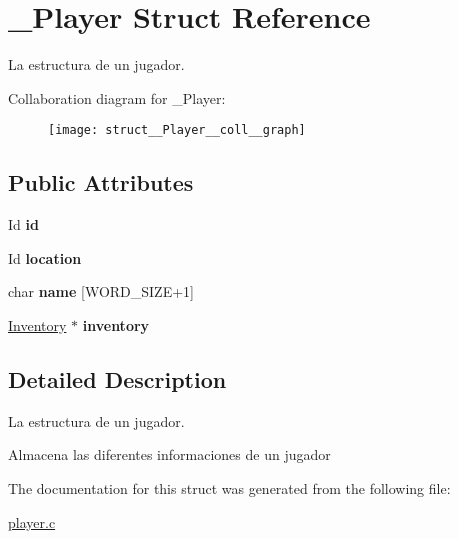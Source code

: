 \hypertarget{struct__Player}{}\section{\+\_\+\+Player Struct Reference}
\label{struct__Player}


La estructura de un jugador.  




Collaboration diagram for \+\_\+\+Player\+:\nopagebreak
\begin{figure}[H]
\begin{center}
\leavevmode
\texttt{[image: struct\_\_Player\_\_coll\_\_graph]}
\end{center}
\end{figure}
\subsection*{Public Attributes}
\begin{DoxyCompactItemize}
\item 
\mbox{\label{struct__Player_a60d635cd063816a9c1bd873f4868bb90}} 
Id {\bfseries id}
\item 
\mbox{\label{struct__Player_adbb6195d15b88f3f658e74274eff52d8}} 
Id {\bfseries location}
\item 
\mbox{\label{struct__Player_ac89715f913cc607b75eb7236765c41f5}} 
char {\bfseries name} \mbox{[}W\+O\+R\+D\+\_\+\+S\+I\+ZE+1\mbox{]}
\item 
\mbox{\label{struct__Player_a5e02924cb82ca61f74ba414d190aa29b}} 
\hyperlink{struct__Inventory}{Inventory} $\ast$ {\bfseries inventory}
\end{DoxyCompactItemize}


\subsection{Detailed Description}
La estructura de un jugador. 

Almacena las diferentes informaciones de un jugador 

The documentation for this struct was generated from the following file\+:\begin{DoxyCompactItemize}
\item 
\hyperlink{player_8c}{player.\+c}\end{DoxyCompactItemize}
